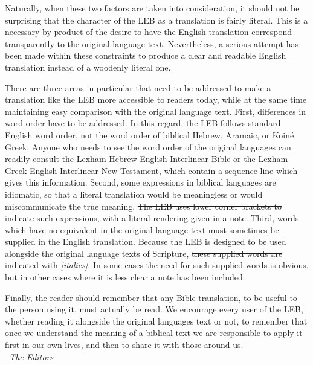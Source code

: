 Naturally, when these two factors are taken into consideration, it should not be surprising that the character of the LEB 
as a translation is fairly literal. This is a necessary by-product of the desire to have the English translation correspond 
transparently to the original language text. Nevertheless, a serious attempt has been made within these constraints to produce 
a clear and readable English translation instead of a woodenly literal one.\par

There are three areas in particular that need to be addressed to make a translation like the LEB more accessible to readers 
today, while at the same time maintaining easy comparison with the original language text. First, differences in word order 
have to be addressed. In this regard, the LEB follows standard English word order, not the word order of biblical Hebrew, 
Aramaic, or Koiné Greek. Anyone who needs to see the word order of the original languages can readily consult the Lexham 
Hebrew-English Interlinear Bible or the Lexham Greek-English Interlinear New Testament, which contain a sequence line which 
gives this information. Second, some expressions in biblical languages are idiomatic, so that a literal translation would 
be meaningless or would miscommunicate the true meaning. \st{The LEB uses lower corner brackets to indicate such expressions, 
with a literal rendering given in a note}. Third, words which have no equivalent in the original language text must sometimes 
be supplied in the English translation. Because the LEB is designed to be used alongside the original language texts of 
Scripture, \st{these supplied words are indicated with \textit{[italics]}}. In some cases the need for such supplied words is obvious, 
but in other cases where it is less clear \st{a note has been included}.\par
Finally, the reader should remember that any Bible translation, to be useful to the person using it, must actually be read. 
We encourage every user of the LEB, whether reading it alongside the original languages text or not, to remember that once 
we understand the meaning of a biblical text we are responsible to apply it first in our own lives, and then to share it 
with those around us.\\
\textit{--The Editors}\par




